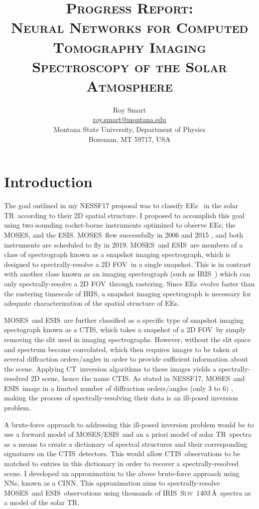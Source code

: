 \documentclass[10pt,letterpaper, doublespace]{article}
\title{\textsc{Progress Report: \\ Neural Networks for Computed Tomography Imaging Spectroscopy of the Solar Atmosphere}}
\author{Roy Smart \\ \url{roy.smart@montana.edu} \\ Montana State University, Department of Physics \\ Bozeman, MT 59717, USA}
\newcommand{\SiIV}{Si\,\textsc{iv}~1403\,\AA}
\newcommand{\TR}{\ac{TR}}
\newcommand{\EEs}{\acp{EE}}
\newcommand{\CT}{\ac{CT}}
\newcommand{\CTIS}{\ac{CTIS}}
\newcommand{\MOSES}{\ac{MOSES}}
\newcommand{\ESIS}{\ac{ESIS}}
\newcommand{\FOV}{\ac{FOV}}
\newcommand{\NNs}{\acp{NN}}
\newcommand{\CINN}{\ac{CINN}}
\newcommand{\IRIS}{\ac{IRIS}}
\begin{document}
	
	\maketitle
	
	
	\section{Introduction}
	
		The goal outlined in my NESSF17 proposal was to classify \EEs\ \citep{Brueckner1983} in the solar \TR\ according to their 2D spatial structure.
		I proposed to accomplish this goal using two sounding rocket-borne instruments optimized to observe \EEs; the \MOSES \citep{kankel1}, and the \ESIS.
		\MOSES\ flew successfully in 2006 \citep{fox1} and 2015 \citep{smart1}, and both instruments are scheduled to fly in 2019.
		\MOSES\ and \ESIS\ are members of a class of spectrograph known as a snapshot imaging spectrograph, which is designed to spectrally-resolve a 2D \FOV\ in a single snapshot. This is in contrast with another class known as an imaging spectrograph (such as \IRIS\ \citep{DePontieu2014}) which can only spectrally-resolve a 2D \FOV\ through rastering.  
		Since \EEs\ evolve faster than the rastering timescale of \IRIS \citep{kankel1,DePontieu2014}, a snapshot imaging spectrograph is necessary for adequate characterization of the spatial structure of \EEs.
		
		\MOSES\ and \ESIS\ are further classified as a specific type of snapshot imaging spectograph known as a \CTIS \citep{Okamoto:91}, which takes a snapshot of a 2D \FOV\ by simply removing the slit used in imaging spectrographs.
		However, without the slit space and spectrum become convoluted, which then requires images to be taken at several diffraction orders/angles in order to provide sufficient information about the scene.
		Applying \CT\ inversion algorithms to these images yields a spectrally-resolved 2D scene, hence the name \CTIS.
		As stated in NESSF17, \MOSES\ and \ESIS\ image in a limited number of diffraction orders/angles (only 3 to 6) \citep{kankel1}, making the process of spectrally-resolving their data is an ill-posed inversion problem.
		
		A brute-force approach to addressing this ill-posed inversion problem would be to use a forward model of \MOSES/\ESIS\ and an a priori model of solar \TR\ spectra as a means to create a dictionary of spectral structures and their corresponding signatures on the \CTIS\ detectors.
		This would allow \CTIS\ observations to be matched to entries in this dictionary in order to recover a spectrally-resolved scene.
		I developed an approximation to the above brute-force approach using \NNs, known as a \CINN.
		This approximation aims to spectrally-resolve \MOSES\ and \ESIS\ observations using thousands of \IRIS\ \SiIV\ spectra as a model of the solar \TR.
		
\end{document}
